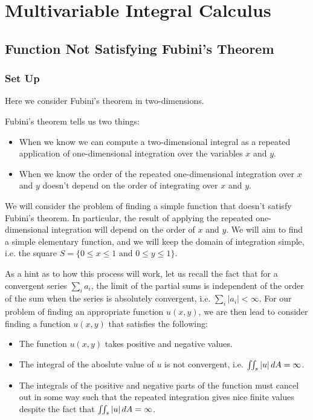 \section{Multivariable Integral Calculus}

\subsection{Function Not Satisfying Fubini's Theorem}

\subsubsection*{Set Up}

Here we consider Fubini's theorem in two-dimensions.

Fubini's theorem tells us two things:
\begin{itemize}
\item When we know we can compute a two-dimensional integral as a repeated application of one-dimensional integration over the variables \(x\) and \(y\).

\item When we know the order of the repeated one-dimensional integration over \(x\) and \(y\) doesn't depend on the order of integrating over \(x\) and \(y\). 

\end{itemize}

We will consider the problem of finding a simple function that doesn't satisfy Fubini's theorem. In particular, the result of applying the repeated 
one-dimensional integration will depend on the order of \(x\) and \(y\). We will aim to find a simple elementary function, and we will keep the domain of integration
simple, i.e. the square \(S = \{0 \leq x \leq 1 \text{ and } 0 \leq y \leq 1\}\).

As a hint as to how this process will work, let us recall the fact that for a convergent series \(\sum_i a_i\), the limit of the partial sums is independent of the order of
the sum when the series is absolutely convergent, i.e. \(\sum_i |a_i| < \infty\). For our problem of finding an appropriate function \(u(x,y)\), we are then lead to consider
finding a function \(u(x,y)\) that satisfies the following:
\begin{itemize}
\item The function \(u(x,y)\) takes positive and negative values. 
\item The integral of the aboslute value of \(u\) is not convergent, i.e. \(\iint_s |u| \, dA = \infty\).
\item The integrals of the positive and negative parts of the function must cancel out in some way such that the repeated integration gives nice finite values despite
the fact that \(\iint_s |u| \, dA = \infty\).
\end{itemize}


